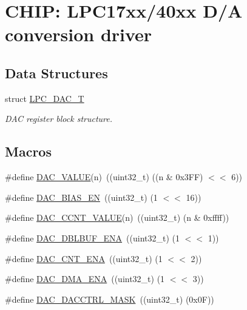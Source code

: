 \hypertarget{group__DAC__17XX__40XX}{\section{C\-H\-I\-P\-: L\-P\-C17xx/40xx D/\-A conversion driver}
\label{group__DAC__17XX__40XX}
}
\subsection*{Data Structures}
\begin{DoxyCompactItemize}
\item 
struct \hyperlink{structLPC__DAC__T}{L\-P\-C\-\_\-\-D\-A\-C\-\_\-\-T}
\begin{DoxyCompactList}\small\item\em D\-A\-C register block structure. \end{DoxyCompactList}\end{DoxyCompactItemize}
\subsection*{Macros}
\begin{DoxyCompactItemize}
\item 
\#define \hyperlink{group__DAC__17XX__40XX_gac8d652cef1a35726a91ef3e5b4bad59c}{D\-A\-C\-\_\-\-V\-A\-L\-U\-E}(n)~((uint32\-\_\-t) ((n \& 0x3\-F\-F) $<$$<$ 6))
\item 
\#define \hyperlink{group__DAC__17XX__40XX_gabdfe0f0d61a206418a2ffdba26653873}{D\-A\-C\-\_\-\-B\-I\-A\-S\-\_\-\-E\-N}~((uint32\-\_\-t) (1 $<$$<$ 16))
\item 
\#define \hyperlink{group__DAC__17XX__40XX_ga23fecd9fa274c0f8387aad48330a0432}{D\-A\-C\-\_\-\-C\-C\-N\-T\-\_\-\-V\-A\-L\-U\-E}(n)~((uint32\-\_\-t) (n \& 0xffff))
\item 
\#define \hyperlink{group__DAC__17XX__40XX_gaa52ab08dc967f09afb7fcbb15ef1b1c0}{D\-A\-C\-\_\-\-D\-B\-L\-B\-U\-F\-\_\-\-E\-N\-A}~((uint32\-\_\-t) (1 $<$$<$ 1))
\item 
\#define \hyperlink{group__DAC__17XX__40XX_gae7c63d487a239e6abaf2bfdced3c67e4}{D\-A\-C\-\_\-\-C\-N\-T\-\_\-\-E\-N\-A}~((uint32\-\_\-t) (1 $<$$<$ 2))
\item 
\#define \hyperlink{group__DAC__17XX__40XX_gab00cf8cef7eee4ff812d53ae52e4b38d}{D\-A\-C\-\_\-\-D\-M\-A\-\_\-\-E\-N\-A}~((uint32\-\_\-t) (1 $<$$<$ 3))
\item 
\#define \hyperlink{group__DAC__17XX__40XX_ga3d9ce4bc003bffdea6fb98da402d2318}{D\-A\-C\-\_\-\-D\-A\-C\-C\-T\-R\-L\-\_\-\-M\-A\-S\-K}~((uint32\-\_\-t) (0x0\-F))
\end{DoxyCompactItemize}
